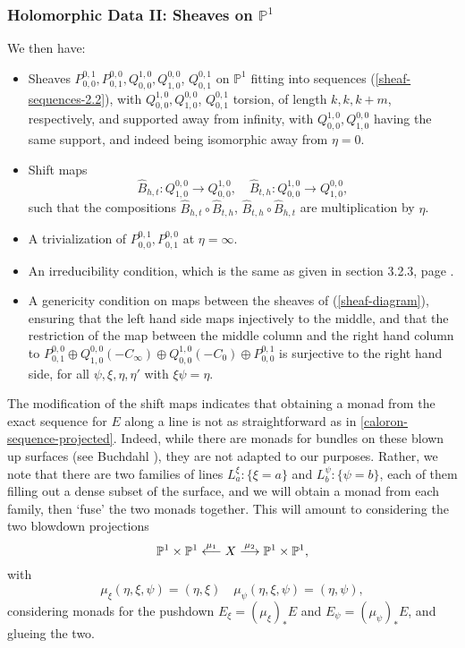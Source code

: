 \documentclass[12pt]{article}
\theoremstyle{definition}
\theoremstyle{remark}
\numberwithin{theorem}{section}
\def\bP{{\mathbb {P}}}
\begin{document}
 \subsubsection{Holomorphic Data II: Sheaves   on $\bP^1$}
We then have:
\begin{itemize} 
\item Sheaves $P_{0,0}^{0 ,1}, P_{0,1}^{0 ,0}, Q_{0,0}^{1,0} ,Q_{1,0}^{0,0}$, $Q_{0,1}^{0 ,1}$ on $\bP^1$ fitting into sequences (\ref{sheaf-sequences-2.2}), with $Q_{0,0}^{1,0} ,Q_{1,0}^{0,0}$, $Q_{0,1}^{0 ,1}$ torsion, of length $k, k, k+m$, respectively, and supported away from infinity, with  $Q_{0,0}^{1,0} ,Q_{1,0}^{0,0}$ having the same support, and indeed being isomorphic away from $\eta =0$. 
\item Shift maps 
$$\widehat B_{h,t}: Q_{ 1,0}^{ 0,0}\rightarrow Q_{0 ,0}^{1,0},\quad \widehat B_{t,h}: Q_{0,0}^{1,0}\rightarrow Q_{1,0}^{0,0},$$
such that the  compositions $\widehat B_{h,t}\circ \widehat B_{t,h}$, $\widehat B_{t,h}\circ \widehat B_{h,t}$ are multiplication by   $\eta$.
\item A trivialization of $P_{0,0}^{0 ,1}, P_{0,1}^{0 ,0}$ at $\eta =\infty$.
\item An irreducibility condition, which is the same as given in section 3.2.3, page \pageref{IrredCond}.
\item A genericity condition on maps between the sheaves  of (\ref{sheaf-diagram}), ensuring that the left hand side maps injectively to the middle, and that the  restriction of the map between the middle column and the right hand column to  $P^{0,0}_{0,1}\oplus Q_{ 1,0}^{0,0}(-C_\infty )\oplus Q_{0 ,0}^{ 1,0} (-C_0 )\oplus P^{0,1}_{0,0}$ is surjective  to the right hand side, for all $\psi, \xi,\eta, \eta'$ with $\xi\psi =\eta $.
 \end{itemize} 


 The modification of the shift maps indicates  that obtaining a monad from the exact sequence for $E$ along a line is not as  straightforward  as in \eqref{caloron-sequence-projected}.  Indeed, while there are monads for bundles on these blown up surfaces (see Buchdahl \cite{Buchdahl}), they are not adapted to our purposes. Rather, we note that there are two families of lines $L^\xi_a :\{\xi= a\}$ and  $L^\psi_b: \{\psi= b\}$, each of them filling out a dense subset of the surface, and we will obtain a monad from each family, then `fuse' the two monads together. This will amount to considering the two blowdown projections 
 $$\bP^1\times \bP^1 \buildrel{\mu_1}\over{\longleftarrow} X \buildrel{\mu_2}\over{\longrightarrow} \bP^1\times \bP^1,$$
 with 
 $$  \mu_\xi(\eta, \xi,\psi) = (\eta, \xi ) \quad \mu_\psi(\eta, \xi,\psi) = (\eta,  \psi), $$
 considering monads for the pushdown $E_\xi =   (\mu_\xi)_*E$ and  $E_\psi =   (\mu_\psi)_*E$, and glueing the two.
 
\end{document}
